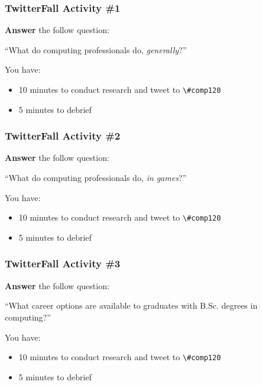 \begin{frame}
	\frametitle{TwitterFall Activity \#1}
	
	\textbf{Answer} the follow question:
	
	\vspace{1em}
	
	``What do computing professionals do, \textit{generally}?''
	
	\vspace{1em}
	
	You have:
	
	\begin{itemize}
		\item 10 minutes to conduct research and tweet to \lstinline{\#comp120}
		\item 5 minutes to debrief
	\end{itemize}
\end{frame}

\begin{frame}
	\frametitle{TwitterFall Activity \#2}
	
	\textbf{Answer} the follow question:
	
	\vspace{1em}
	
	``What do computing professionals do, \textit{in games}?''
	
	\vspace{1em}
	
	You have:
	
	\begin{itemize}
		\item 10 minutes to conduct research and tweet to \lstinline{\#comp120}
		\item 5 minutes to debrief
	\end{itemize}
\end{frame}

\begin{frame}
	\frametitle{TwitterFall Activity \#3}
	
	\textbf{Answer} the follow question:
	
	\vspace{1em}
	
	``What career options are available to graduates with B.Sc. degrees in computing?''
	
	\vspace{1em}
	
	You have:
	
	\begin{itemize}
		\item 10 minutes to conduct research and tweet to \lstinline{\#comp120}
		\item 5 minutes to debrief
	\end{itemize}
\end{frame}

